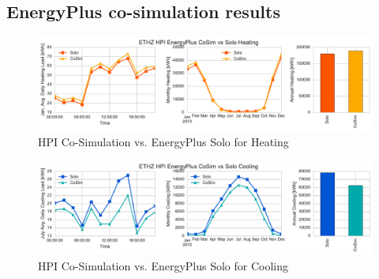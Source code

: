 \documentclass{tBPS2e}
\theoremstyle{plain}
\theoremstyle{definition}
\theoremstyle{remark}
\begin{document}
\subsection{EnergyPlus co-simulation results}

\begin{figure}[H]
\centering
\includegraphics[scale=0.55]{figures/HPI_EnergyPlus_Heating}
\caption{HPI Co-Simulation vs. EnergyPlus Solo for Heating}
\label{fig:hpi_energyplusheating}
\end{figure}

\begin{figure}[H]
\centering
\includegraphics[scale=0.55]{figures/HPI_EnergyPlus_Cooling}
\caption{HPI Co-Simulation vs. EnergyPlus Solo for Cooling}
\label{fig:hpi_energypluscooling}
\end{figure}





\end{document}
